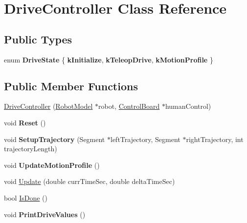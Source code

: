 \hypertarget{class_drive_controller}{}\section{Drive\+Controller Class Reference}
\label{class_drive_controller}
\subsection*{Public Types}
\begin{DoxyCompactItemize}
\item 
\mbox{\label{class_drive_controller_abb183068492c689edb76fe802a4a35ad}} 
enum {\bfseries Drive\+State} \{ {\bfseries k\+Initialize}, 
{\bfseries k\+Teleop\+Drive}, 
{\bfseries k\+Motion\+Profile}
 \}
\end{DoxyCompactItemize}
\subsection*{Public Member Functions}
\begin{DoxyCompactItemize}
\item 
\hyperlink{class_drive_controller_a166bb5ed50199d8482ebbc0e244742a1}{Drive\+Controller} (\hyperlink{class_robot_model}{Robot\+Model} $\ast$robot, \hyperlink{class_control_board}{Control\+Board} $\ast$human\+Control)
\item 
\mbox{\label{class_drive_controller_afb1d02465d9feb19335db06c6d686552}} 
void {\bfseries Reset} ()
\item 
\mbox{\label{class_drive_controller_af4ca4d578446f17730c960a3650fb140}} 
void {\bfseries Setup\+Trajectory} (Segment $\ast$left\+Trajectory, Segment $\ast$right\+Trajectory, int trajectory\+Length)
\item 
\mbox{\label{class_drive_controller_a80935e19c13c8f9212054af0183e53ad}} 
void {\bfseries Update\+Motion\+Profile} ()
\item 
void \hyperlink{class_drive_controller_aefc9e8cbe2948d2e72987e0a8a2cbf80}{Update} (double curr\+Time\+Sec, double delta\+Time\+Sec)
\item 
bool \hyperlink{class_drive_controller_ae07d828e9b1738bd0baf6dca46e5bd5c}{Is\+Done} ()
\item 
\mbox{\label{class_drive_controller_abbcf50b6d01eda0d1a45131dfeb97db8}} 
void {\bfseries Print\+Drive\+Values} ()
\end{DoxyCompactItemize}

